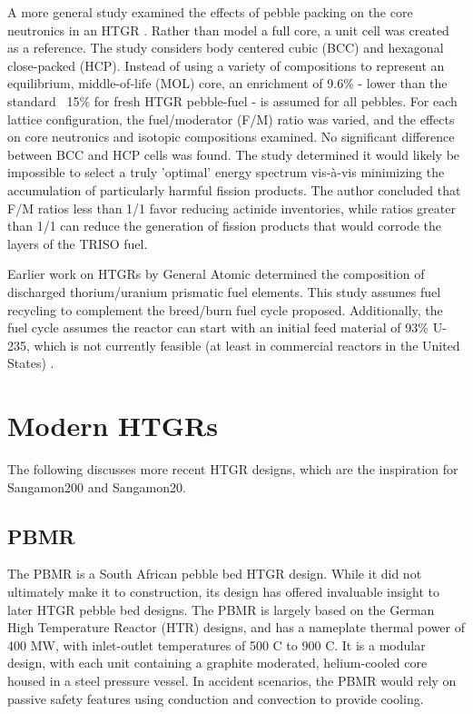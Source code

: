 A more general study examined the effects of pebble packing on the core neutronics in an HTGR \cite{turkmen_effect_2012}.  Rather than model a full core, a unit cell was created as a reference.  The study considers body centered cubic (BCC) and hexagonal close-packed (HCP).  Instead of using a variety of compositions to represent an equilibrium, middle-of-life (MOL) core, an enrichment of 9.6\%  - lower than the standard ~15\% for fresh HTGR pebble-fuel - is assumed for all pebbles.  For each lattice configuration, the fuel/moderator (F/M) ratio was varied, and the effects on core neutronics and isotopic compositions examined.  No significant difference between BCC and HCP cells was found.  The study determined it would likely be impossible to select a truly 'optimal' energy spectrum vis-\`{a}-vis minimizing the accumulation of particularly harmful fission products.  The author concluded that F/M ratios less than 1/1 favor reducing actinide inventories, while ratios greater than 1/1 can reduce the generation of fission products that would corrode the layers of the TRISO fuel.

Earlier work on HTGRs by General Atomic determined the composition of discharged thorium/uranium prismatic fuel elements.  This study assumes fuel recycling to complement the breed/burn fuel cycle proposed.  Additionally, the fuel cycle assumes the reactor can start with an initial feed material of 93\% U-235, which is not currently feasible (at least in commercial reactors in the United States) \cite{hamilton_htgr_1976}.


\section{Modern HTGRs}

The following discusses more recent HTGR designs, which are the inspiration for Sangamon200 and Sangamon20.

\subsection{PBMR}

The PBMR is a South African pebble bed HTGR design.  While it did not ultimately make it to construction, its design has offered invaluable insight to later HTGR pebble bed designs.  The PBMR is largely based on the German High Temperature Reactor (HTR) designs, and has a nameplate thermal power of 400 MW, with inlet-outlet temperatures of 500 \textdegree C to 900 \textdegree C.  It is a modular design, with each unit containing a graphite moderated, helium-cooled core housed in a steel pressure vessel.  In accident scenarios, the PBMR would rely on passive safety features using conduction and convection to provide cooling.


